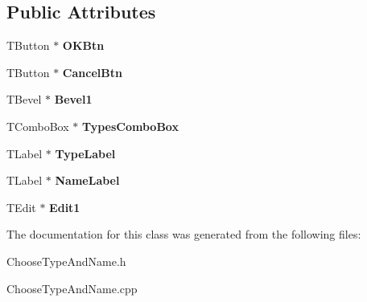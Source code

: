 \subsection*{Public Attributes}
\begin{DoxyCompactItemize}
\item 
\hypertarget{class_t_type_and_name_dlg_a172a569d7295035772c810a60dfa080f}{T\+Button $\ast$ {\bfseries O\+K\+Btn}}\label{class_t_type_and_name_dlg_a172a569d7295035772c810a60dfa080f}

\item 
\hypertarget{class_t_type_and_name_dlg_a6913f634b25925ef2b6fe4098a446ed4}{T\+Button $\ast$ {\bfseries Cancel\+Btn}}\label{class_t_type_and_name_dlg_a6913f634b25925ef2b6fe4098a446ed4}

\item 
\hypertarget{class_t_type_and_name_dlg_aa055b544eef7cb56e215ba1a7adf1cc1}{T\+Bevel $\ast$ {\bfseries Bevel1}}\label{class_t_type_and_name_dlg_aa055b544eef7cb56e215ba1a7adf1cc1}

\item 
\hypertarget{class_t_type_and_name_dlg_a3e9fc34cc89f95bc96ec6c17c84b6b33}{T\+Combo\+Box $\ast$ {\bfseries Types\+Combo\+Box}}\label{class_t_type_and_name_dlg_a3e9fc34cc89f95bc96ec6c17c84b6b33}

\item 
\hypertarget{class_t_type_and_name_dlg_ae745e15735024142b9e9073f2c8c0101}{T\+Label $\ast$ {\bfseries Type\+Label}}\label{class_t_type_and_name_dlg_ae745e15735024142b9e9073f2c8c0101}

\item 
\hypertarget{class_t_type_and_name_dlg_a6b4a26324b0eba099ce8d1df1bf3738e}{T\+Label $\ast$ {\bfseries Name\+Label}}\label{class_t_type_and_name_dlg_a6b4a26324b0eba099ce8d1df1bf3738e}

\item 
\hypertarget{class_t_type_and_name_dlg_a731ba70fb19ffcb62d48269270505014}{T\+Edit $\ast$ {\bfseries Edit1}}\label{class_t_type_and_name_dlg_a731ba70fb19ffcb62d48269270505014}

\end{DoxyCompactItemize}


The documentation for this class was generated from the following files\+:\begin{DoxyCompactItemize}
\item 
Choose\+Type\+And\+Name.\+h\item 
Choose\+Type\+And\+Name.\+cpp\end{DoxyCompactItemize}

